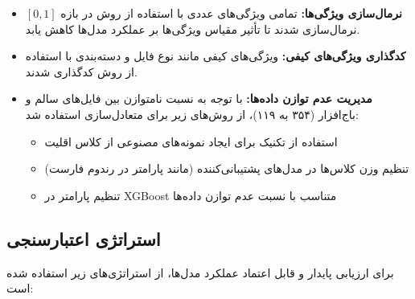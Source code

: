 \begin{itemize}
    \item \textbf{نرمال‌سازی ویژگی‌ها:} تمامی ویژگی‌های عددی با استفاده از روش  در بازه $[0, 1]$ نرمال‌سازی شدند تا تأثیر مقیاس ویژگی‌ها بر عملکرد مدل‌ها کاهش یابد.

    \item \textbf{کدگذاری ویژگی‌های کیفی:} ویژگی‌های کیفی مانند نوع فایل و دسته‌بندی با استفاده از روش  کدگذاری شدند.

    \item \textbf{مدیریت عدم توازن داده‌ها:} با توجه به نسبت نامتوازن بین فایل‌های سالم و باج‌افزار (۳۵۴ به ۱۱۹)، از روش‌های زیر برای متعادل‌سازی استفاده شد:
    \begin{itemize}
        \item استفاده از تکنیک  برای ایجاد نمونه‌های مصنوعی از کلاس اقلیت
        \item تنظیم وزن کلاس‌ها در مدل‌های پشتیبانی‌کننده (مانند پارامتر  در رندوم فارست)
        \item تنظیم پارامتر  در XGBoost متناسب با نسبت عدم توازن داده‌ها
    \end{itemize}
\end{itemize}

\subsection{استراتژی اعتبارسنجی}
برای ارزیابی پایدار و قابل اعتماد عملکرد مدل‌ها، از استراتژی‌های زیر استفاده شده است:

